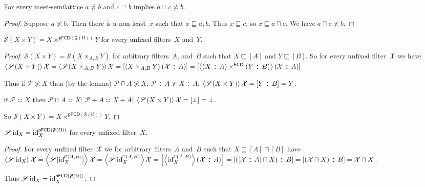 \begin{lem}
For every meet-semilattice $a\nasymp b$ and
$c\sqsupseteq b$ implies $a\sqcap c\nasymp b$.
\end{lem}

\begin{proof}
Suppose $a\nasymp b$. Then there is a non-least~$x$
such that $x\sqsubseteq a,b$. Thus $x\sqsubseteq c$,
so $x\sqsubseteq a\sqcap c$. We have
$a\sqcap c\nasymp b$.
\end{proof}


\begin{prop}\label{pfunf-prod}
$\mathscr{S}(X\times Y)
=X\times^{\mathsf{pFCD}(\mathfrak{F}(\mho))}Y$
for every unfixed filters~$X$ and~$Y$.
\end{prop}

\begin{proof}
$\mathscr{S}(X\times Y) = \mathscr{S}(X\times_{A,B}Y)$
for arbitrary filters~$A$, and~$B$ such that
$X\sqsubseteq[A]$ and $Y\sqsubseteq[B]$. So
for every unfixed filter~$\mathcal{X}$ we have
$\left\langle \mathscr{S}(X\times Y)\right\rangle\mathcal{X}=
\left\langle \mathscr{S}(X\times_{A,B}Y)\right\rangle\mathcal{X}=
[\left\langle X\times_{A,B}Y\right\rangle(\mathcal{X}\div A)]=
[\left\langle (X\div A)\times^{\mathsf{FCD}}(Y\div B)\right\rangle
(\mathcal{X}\div A)]$

Thus if $\mathcal{P}\nasymp X$ then
(by the lemma)
$\mathcal{P}\sqcap A\nasymp X$;
$\mathcal{P}\div A\nasymp X\div A$;
$\left\langle \mathscr{S}(X\times Y)\right\rangle\mathcal{X}=
[Y\div B]=Y$.

if $\mathcal{P}\asymp X$ then
$\mathcal{P}\sqcap A\asymp X$;
$\mathcal{P}\div A\asymp X\div A$;
$\left\langle \mathscr{S}(X\times Y)\right\rangle\mathcal{X}=
[\bot]=\bot$.

So $\mathscr{S}(X\times Y)
=X\times^{\mathsf{pFCD}(\mathfrak{F}(\mho))}Y$.
\end{proof}

\begin{prop}\label{pfunf-id}
$\mathscr{S}\operatorname{id}_X=
\operatorname{id}^{\mathsf{pFCD}(\mathfrak{F}(\mho))}_{X}$
for every unfixed filter~$X$.
\end{prop}

\begin{proof}
For every unfixed filter~$\mathcal{X}$ we
for arbitrary filters~$A$ and~$B$ such that
$X\sqsubseteq[A]\sqcap[B]$
have
$\left\langle \mathscr{S}\operatorname{id}_X\right\rangle\mathcal{X}=
\left\langle \mathscr{S}[\operatorname{id}^{\mathcal{C}(A,B)}_X]\right\rangle\mathcal{X}=
\left\langle \mathscr{S}\operatorname{id}^{\mathcal{C}(A,B)}_X\right\rangle
\mathcal{X}=
\left[\left\langle \operatorname{id}^{\mathcal{C}(A,B)}_X\right\rangle
(\mathcal{X}\div A)\right]=
[([\mathcal{X}\div A]\sqcap X)\div B]=
[(\mathcal{X}\sqcap X)\div B]=
\mathcal{X}\sqcap X$.

Thus $\mathscr{S}\operatorname{id}_X=
\operatorname{id}^{\mathsf{pFCD}(\mathfrak{F}(\mho))}_{X}$.
\end{proof}


